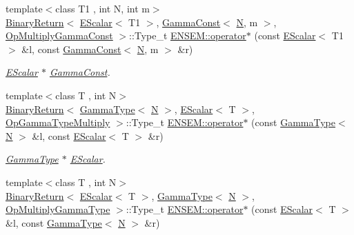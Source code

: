 \begin{DoxyCompactItemize}
{\footnotesize template$<$class T1 , int N, int m$>$ }\\\mbox{\hyperlink{structENSEM_1_1BinaryReturn}{Binary\+Return}}$<$ \mbox{\hyperlink{classENSEM_1_1EScalar}{E\+Scalar}}$<$ T1 $>$, \mbox{\hyperlink{classENSEM_1_1GammaConst}{Gamma\+Const}}$<$ \mbox{\hyperlink{operator__name__util_8cc_a7722c8ecbb62d99aee7ce68b1752f337}{N}}, m $>$, \mbox{\hyperlink{structENSEM_1_1OpMultiplyGammaConst}{Op\+Multiply\+Gamma\+Const}} $>$\+::Type\+\_\+t \mbox{\hyperlink{group__escalar_ga10de70ea3b5491035fab4f67de013321}{E\+N\+S\+E\+M\+::operator$\ast$}} (const \mbox{\hyperlink{classENSEM_1_1EScalar}{E\+Scalar}}$<$ T1 $>$ \&l, const \mbox{\hyperlink{classENSEM_1_1GammaConst}{Gamma\+Const}}$<$ \mbox{\hyperlink{operator__name__util_8cc_a7722c8ecbb62d99aee7ce68b1752f337}{N}}, m $>$ \&r)
\begin{DoxyCompactList}\small\item\em \mbox{\hyperlink{classENSEM_1_1EScalar}{E\+Scalar}} $\ast$ \mbox{\hyperlink{classENSEM_1_1GammaConst}{Gamma\+Const}}. \end{DoxyCompactList}\item 
{\footnotesize template$<$class T , int N$>$ }\\\mbox{\hyperlink{structENSEM_1_1BinaryReturn}{Binary\+Return}}$<$ \mbox{\hyperlink{classENSEM_1_1GammaType}{Gamma\+Type}}$<$ \mbox{\hyperlink{operator__name__util_8cc_a7722c8ecbb62d99aee7ce68b1752f337}{N}} $>$, \mbox{\hyperlink{classENSEM_1_1EScalar}{E\+Scalar}}$<$ T $>$, \mbox{\hyperlink{structENSEM_1_1OpGammaTypeMultiply}{Op\+Gamma\+Type\+Multiply}} $>$\+::Type\+\_\+t \mbox{\hyperlink{group__escalar_ga53bf11728d0f1f7fb9dea51cd221792d}{E\+N\+S\+E\+M\+::operator$\ast$}} (const \mbox{\hyperlink{classENSEM_1_1GammaType}{Gamma\+Type}}$<$ \mbox{\hyperlink{operator__name__util_8cc_a7722c8ecbb62d99aee7ce68b1752f337}{N}} $>$ \&l, const \mbox{\hyperlink{classENSEM_1_1EScalar}{E\+Scalar}}$<$ T $>$ \&r)
\begin{DoxyCompactList}\small\item\em \mbox{\hyperlink{classENSEM_1_1GammaType}{Gamma\+Type}} $\ast$ \mbox{\hyperlink{classENSEM_1_1EScalar}{E\+Scalar}}. \end{DoxyCompactList}\item 
{\footnotesize template$<$class T , int N$>$ }\\\mbox{\hyperlink{structENSEM_1_1BinaryReturn}{Binary\+Return}}$<$ \mbox{\hyperlink{classENSEM_1_1EScalar}{E\+Scalar}}$<$ T $>$, \mbox{\hyperlink{classENSEM_1_1GammaType}{Gamma\+Type}}$<$ \mbox{\hyperlink{operator__name__util_8cc_a7722c8ecbb62d99aee7ce68b1752f337}{N}} $>$, \mbox{\hyperlink{structENSEM_1_1OpMultiplyGammaType}{Op\+Multiply\+Gamma\+Type}} $>$\+::Type\+\_\+t \mbox{\hyperlink{group__escalar_gacd3a5ba72921d671ee94910188b8c179}{E\+N\+S\+E\+M\+::operator$\ast$}} (const \mbox{\hyperlink{classENSEM_1_1EScalar}{E\+Scalar}}$<$ T $>$ \&l, const \mbox{\hyperlink{classENSEM_1_1GammaType}{Gamma\+Type}}$<$ \mbox{\hyperlink{operator__name__util_8cc_a7722c8ecbb62d99aee7ce68b1752f337}{N}} $>$ \&r)

\end{DoxyCompactItemize}
